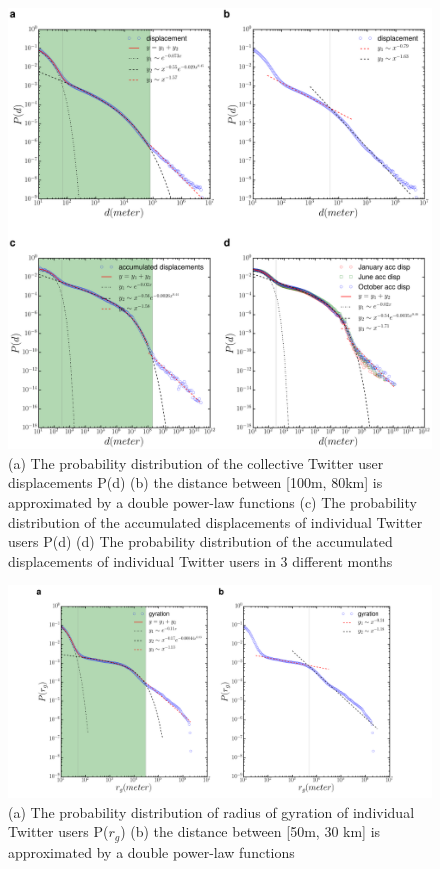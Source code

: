\documentclass[a4paper, 11pt]{article}
\begin{document}
\begin{figure}[h]
\centering
\includegraphics[width=1.0\linewidth]{./figures/displacement}
\caption{(a) The probability distribution of the collective Twitter user displacements P(d) (b) the distance between [100m, 80km] is approximated by a double power-law functions (c) The probability distribution of the accumulated displacements of individual Twitter users P(d) (d) The probability distribution of the accumulated displacements of individual Twitter users in 3 different months}
\label{fig:Arch}
\end{figure}\textbf{}
\FloatBarrier

\begin{figure}[h]
\centering
\includegraphics[width=1.0\linewidth]{./figures/gyration}
\caption{ (a) The probability distribution of radius of gyration of individual Twitter users P($r_{g}$) (b) the distance between [50m, 30 km] is approximated by a double power-law functions}
\label{fig:Arch}
\end{figure}
\FloatBarrier
\end{document}
